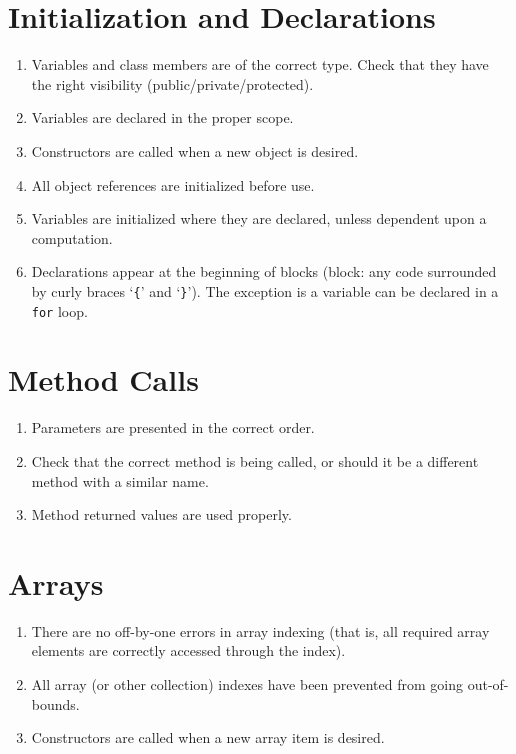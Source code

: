 \section*{Initialization and Declarations}\begin{enumerate}[resume]
\item Variables and class members are of the correct type. Check that they have the right visibility (public/private/protected).
\item Variables are declared in the proper scope.
\item Constructors are called when a new object is desired.
\item All object references are initialized before use.
\item Variables are initialized where they are declared, unless dependent upon a computation.
\item Declarations appear at the beginning of blocks (block: any code surrounded by curly braces `\texttt{\{}' and `\texttt{\}}'). The exception is a variable can be declared in a \texttt{for} loop.
\end{enumerate}

\section*{Method Calls}\begin{enumerate}[resume]
\item Parameters are presented in the correct order.
\item Check that the correct method is being called, or should it be a different method with a similar name.
\item Method returned values are used properly.
\end{enumerate}

\section*{Arrays}\begin{enumerate}[resume]
\item There are no off-by-one errors in array indexing (that is, all required array elements are correctly accessed through the index).
\item All array (or other collection) indexes have been prevented from going out-of-bounds.
\item Constructors are called when a new array item is desired.
\end{enumerate}

